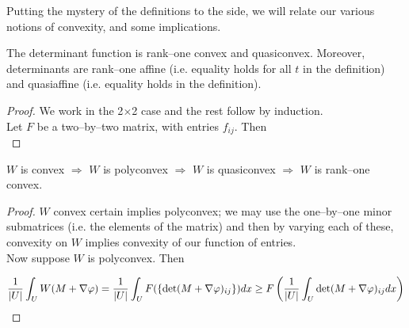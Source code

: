 \documentclass[../main.tex]{subfiles}
\begin{document}
Putting the mystery of the definitions to the side, we will relate our various notions of convexity, and some implications.

\begin{lem}
  The determinant function is rank--one convex and quasiconvex.
  Moreover, determinants are rank--one affine (i.e. equality holds for all $t$ in the definition) and quasiaffine (i.e. equality holds in the definition).
\end{lem}

\begin{proof}
  We work in the 2$\times$2 case and the rest follow by induction. \\

  Let $F$ be a two--by--two matrix, with entries $f_{ij}$.
  Then
  \begin{equation*}
  \end{equation*}
\end{proof}


\begin{thm}
  $W$ is convex $\Rightarrow$ $W$ is polyconvex $\Rightarrow$ $W$ is quasiconvex $\Rightarrow$ $W$ is rank--one convex.
\end{thm}

\begin{proof}
  $W$ convex certain implies polyconvex; we may use the one--by--one minor submatrices (i.e. the elements of the matrix) and then by varying each of these, convexity on $W$ implies convexity of our function of entries. \\

  Now suppose $W$ is polyconvex.
  Then

  \begin{equation*}
    \frac{1}{\lvert U\rvert} \int_U W(M + \nabla \varphi) = \frac{1}{\lvert U\rvert} \int_U F( \{\mathrm{det}( M + \nabla \varphi)_{ij}\} ) dx \geq F\left( \frac{1}{\lvert U\rvert} \int_U \mathrm{det} (M + \nabla \varphi)_{ij} dx \right) 
  \end{equation*}

  
\end{proof}


\printbibliography
\end{document}
